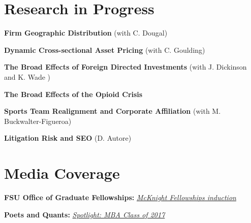 \documentclass[letterpaper,11pt]{article}
\newcommand{\resumeSubHeadingListStart}{\begin{itemize}[leftmargin=0.15in, label={}]}
\newcommand{\resumeSubHeadingListEnd}{\end{itemize}}
\begin{document}

\section{Research in Progress}
\vspace{2pt}
\resumeSubHeadingListStart
  \small{\item{

      \textbf{Firm Geographic Distribution}{ (with C. Dougal)} \\ \vspace{3pt}

      \textbf{Dynamic Cross-sectional Asset Pricing}{ (with C. Goulding)} \\ \vspace{3pt}

      \textbf{The Broad Effects of Foreign Directed Investments}{ (with J. Dickinson and K. Wade )} \\ \vspace{3pt}

      \textbf{The Broad Effects of the Opioid Crisis}{ } \\ \vspace{3pt}
      
      \textbf{Sports Team Realignment and Corporate Affiliation}{ (with M. Buckwalter-Figueroa)} \\ \vspace{3pt}
      
      \textbf{Litigation Risk and SEO}{ (D. Autore) } \\ \vspace{3pt}
      
  }}
\resumeSubHeadingListEnd



\section{Media Coverage}
  \vspace{2pt}
  \resumeSubHeadingListStart
    \small{\item{
        \textbf{FSU Office of Graduate Fellowships:}{ \emph{\href{https://ogfa.fsu.edu/graduate/rodney-ndum}{\color{blue}McKnight Fellowships induction}}} \\ \vspace{3pt}
        
        \textbf{Poets and Quants:}{ \emph{\href{https://poetsandquants.com/2016/05/04/meet-florida-warringtons-mba-class-2017/5/}{\color{blue}Spotlight: MBA Class of 2017}}} \\ \vspace{3pt}
        
    }}
  \resumeSubHeadingListEnd
\end{document}
